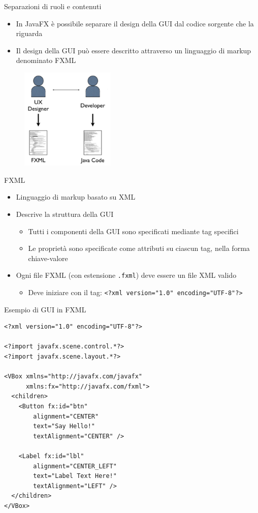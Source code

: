 \documentclass[xcolor=dvipsnames,presentation]{beamer}
\begin{document}
\begin{frame}{Separazioni di ruoli e contenuti}
\begin{itemize}\itemsep10pt
\item In JavaFX è possibile separare il design della GUI dal codice sorgente che la riguarda
\item Il design della GUI può essere descritto attraverso un linguaggio di markup denominato FXML
\end{itemize}
\begin{figure}
\includegraphics[width=0.4\textwidth]{img/soc.png}
\end{figure}
\end{frame}

\begin{frame}{FXML}
\begin{itemize}\itemsep20pt
\item Linguaggio di markup basato su XML
\item Descrive la struttura della GUI
\begin{itemize}
\item Tutti i componenti della GUI sono specificati mediante tag specifici
\item Le proprietà sono specificate come attributi su ciascun tag, nella forma chiave-valore
\end{itemize}
\item Ogni file FXML (con estensione \texttt{.fxml}) deve essere un file XML valido
\begin{itemize}
\item Deve iniziare con il tag: \texttt{<?xml version="1.0" encoding="UTF-8"?>}
\end{itemize}
\end{itemize}
\end{frame}

\begin{frame}[fragile]{Esempio di GUI in FXML}
\begin{lstlisting}
<?xml version="1.0" encoding="UTF-8"?>

<?import javafx.scene.control.*?>
<?import javafx.scene.layout.*?>

<VBox xmlns="http://javafx.com/javafx" 
      xmlns:fx="http://javafx.com/fxml">
  <children>
    <Button fx:id="btn"
    	alignment="CENTER"
    	text="Say Hello!"
    	textAlignment="CENTER" />

    <Label fx:id="lbl"
    	alignment="CENTER_LEFT"
    	text="Label Text Here!"
    	textAlignment="LEFT" />
  </children>
</VBox>
\end{lstlisting}
\end{frame}
\end{document}
